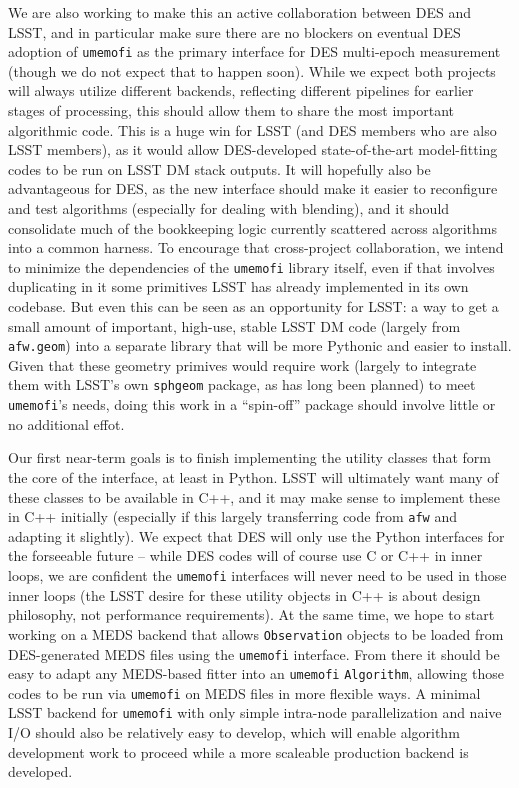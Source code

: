 \documentclass[\docopts]{\docclass}
\begin{document}

We are also working to make this an active collaboration between DES and LSST, and in particular make sure there are no blockers on eventual DES adoption of \texttt{umemofi} as the primary interface for DES multi-epoch measurement (though we do not expect that to happen soon).  While we expect both projects will always utilize different backends, reflecting different pipelines for earlier stages of processing, this should allow them to share the most important algorithmic code.  This is a huge win for LSST (and DES members who are also LSST members), as it would allow DES-developed state-of-the-art model-fitting codes to be run on LSST DM stack outputs.  It will hopefully also be advantageous for DES, as the new interface should make it easier to reconfigure and test algorithms (especially for dealing with blending), and it should consolidate much of the bookkeeping logic currently scattered across algorithms into a common harness.  To encourage that cross-project collaboration, we intend to minimize the dependencies of the \texttt{umemofi} library itself, even if that involves duplicating in it some primitives LSST has already implemented in its own codebase.  But even this can be seen as an opportunity for LSST: a way to get a small amount of important, high-use, stable LSST DM code (largely from \texttt{afw.geom}) into a separate library that will be more Pythonic and easier to install.  Given that these geometry primives would require work (largely to integrate them with LSST's own \texttt{sphgeom} package, as has long been planned) to meet \texttt{umemofi}'s needs, doing this work in a ``spin-off'' package should involve little or no additional effot.

Our first near-term goals is to finish implementing the utility classes that form the core of the interface, at least in Python.  LSST will ultimately want many of these classes to be available in C++, and it may make sense to implement these in C++ initially (especially if this largely transferring code from \texttt{afw} and adapting it slightly).  We expect that DES will only use the Python interfaces for the forseeable future -- while DES codes will of course use C or C++ in inner loops, we are confident the \texttt{umemofi} interfaces will never need to be used in those inner loops (the LSST desire for these utility objects in C++ is about design philosophy, not performance requirements).  At the same time, we hope to start working on a MEDS backend that allows \texttt{Observation} objects to be loaded from DES-generated MEDS files using the \texttt{umemofi} interface.  From there it should be easy to adapt any MEDS-based fitter into an \texttt{umemofi} \texttt{Algorithm}, allowing those codes to be run via \texttt{umemofi} on MEDS files in more flexible ways.  A minimal LSST backend for \texttt{umemofi} with only simple intra-node parallelization and naive I/O should also be relatively easy to develop, which will enable algorithm development work to proceed while a more scaleable production backend is developed.
\end{document}
